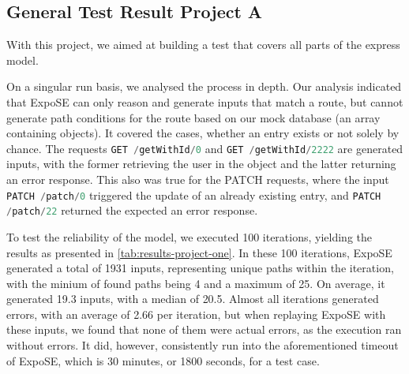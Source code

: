 \subsection{General Test Result Project A}
With this project, we aimed at building a test that covers all parts of the express model.

On a singular run basis, we analysed the process in depth.
Our analysis indicated that ExpoSE can only reason and generate inputs that match a route, but cannot generate path conditions for the route based on our mock database (an array containing objects). It covered the cases, whether an entry exists or not solely by chance. The requests \lstinline[language=JavaScript]{GET /getWithId/0} and \lstinline[language=JavaScript]{GET /getWithId/2222} are generated inputs, with the former retrieving the user in the object and the latter returning an error response. This also was true for the PATCH requests, where the input \lstinline[language=JavaScript]{PATCH /patch/0} 
triggered the update of an already existing entry, and \lstinline[language=JavaScript]{PATCH /patch/22} returned the expected an error response.



To test the reliability of the model, we executed 100 iterations, yielding  the results as presented in \autoref{tab:results-project-one}. 
In these 100 iterations, ExpoSE generated a total of 1931 inputs, representing unique paths within the iteration, with the minium of found paths being 4 and a maximum of 25. On average, it generated 19.3 inputs, with  a median of 20.5. Almost all iterations generated errors, with an average of 2.66 per iteration, but when replaying ExpoSE with these inputs, we found that none of them were actual errors, as the execution ran without errors.
It did, however, consistently run into the aforementioned timeout of ExpoSE, which is 30 minutes, or 1800 seconds, for a test case.

